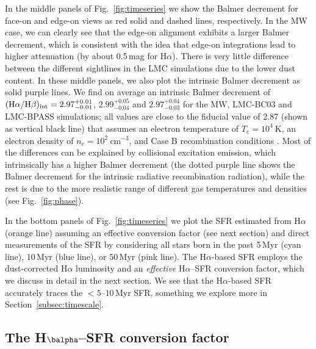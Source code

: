 \documentclass[fleqn,usenatbib]{mnras}
\begin{document}
In the middle panels of Fig.~\ref{fig:timeseries} we show the Balmer decrement for face-on and edge-on views as red solid and dashed lines, respectively. In the MW case, we can clearly see that the edge-on alignment exhibits a larger Balmer decrement, which is consistent with the idea that edge-on integrations lead to higher attenuation (by about 0.5\,mag for H$\alpha$). There is very little difference between the different sightlines in the LMC simulations due to the lower dust content. In these middle panels, we also plot the intrinsic Balmer decrement as solid purple lines. We find on average an intrinsic Balmer decrement of $(\mathrm{H}\alpha/\mathrm{H}\beta)_{\rm int}=2.97_{-0.01}^{+0.01}$, $2.99_{-0.04}^{+0.05}$ and $2.97_{-0.03}^{+0.04}$ for the MW, LMC-BC03 and LMC-BPASS simulations; all values are close to the fiducial value of 2.87 (shown as vertical black line) that assumes an electron temperature of $T_{e}=10^4~\mathrm{K}$, an electron density of $n_e = 10^2~\mathrm{cm}^{-3}$, and Case B recombination conditions \citep{osterbrock06}. Most of the differences can be explained by collisional excitation emission, which intrinsically has a higher Balmer decrement (the dotted purple line shows the Balmer decrement for the intrinsic radiative recombination radiation), while the rest is due to the more realistic range of different gas temperatures and densities (see Fig.~\ref{fig:phase}).

In the bottom panels of Fig.~\ref{fig:timeseries} we plot the SFR estimated from H$\alpha$ (orange line) assuming an effective conversion factor (see next section) and direct measurements of the SFR by considering all stars born in the past 5\,Myr (cyan line), 10\,Myr (blue line), or 50\,Myr (pink line). The H$\alpha$-based SFR employs the dust-corrected H$\alpha$ luminosity and an \textit{effective} H$\alpha$--SFR conversion factor, which we discuss in detail in the next section. We see that the H$\alpha$-based SFR accurately traces the $<5$--$10$\,Myr SFR, something we explore more in Section~\ref{subsec:timescale}.


\subsection{The H\texorpdfstring{$\balpha$}{α}--SFR conversion factor}
\label{subsec:conversion_factor}
\end{document}
